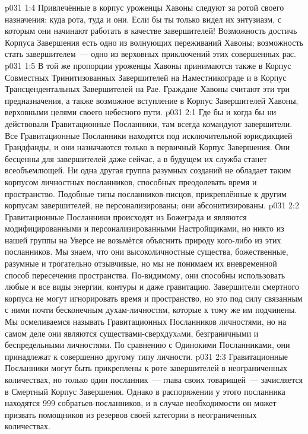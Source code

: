 \vs p031 1:4 Привлечённые в корпус уроженцы Хавоны следуют за ротой своего назначения: куда рота, туда и они. Если бы ты только видел их энтузиазм, с которым они начинают работать в качестве завершителей! Возможность достичь Корпуса Завершения есть одно из волнующих переживаний Хавоны; возможность стать завершителем~--- одно из верховных приключений этих совершенных рас.
\vs p031 1:5 В той же пропорции уроженцы Хавоны принимаются также в Корпус Совместных Тринитизованных Завершителей на Наместникограде и в Корпус Трансцендентальных Завершителей на Рае. Граждане Хавоны считают эти три предназначения, а также возможное вступление в Корпус Завершителей Хавоны, верховными целями своего небесного пути.
\vs p031 2:1 Где бы и когда бы ни действовали Гравитационные Посланники, там всегда командуют завершители. Все Гравитационные Посланники находятся под исключительной юрисдикцией Грандфанды, и они назначаются только в первичный Корпус Завершения. Они бесценны для завершителей даже сейчас, а в будущем их служба станет всеобъемлющей. Ни одна другая группа разумных созданий не обладает таким корпусом личностных посланников, способных преодолевать время и пространство. Подобные типы посланников\hyp{}писцов, прикреплённые к другим корпусам завершителей, не персонализированы; они абсонитизированы.
\vs p031 2:2 \pc Гравитационные Посланники происходят из Божеграда и являются модифицированными и персонализированными Настройщиками, но никто из нашей группы на Уверсе не возьмётся объяснить природу кого\hyp{}либо из этих посланников. Мы знаем, что они высоколичностные существа, божественные, разумные и трогательно отзывчивые, но мы не понимаем их вневременной способ пересечения пространства. По\hyp{}видимому, они способны использовать любые и все виды энергии, контуры и даже гравитацию. Завершители смертного корпуса не могут игнорировать время и пространство, но это под силу связанным с ними почти бесконечным духам\hyp{}личностям, которые к тому же им подчинены. Мы осмеливаемся называть Гравитационных Посланников личностями, но на самом деле они являются существами\hyp{}сверхдухaми, безграничными и беспредельными личностями. По сравнению с Одинокими Посланниками, они принадлежат к совершенно другому типу личности.
\vs p031 2:3 \pc Гравитационные Посланники могут быть прикреплены к роте завершителей в неограниченных количествах, но только один посланник~--- глава своих товарищей~--- зачисляется в Смертный Корпус Завершения. Однако в распоряжении у этого посланника находятся 999 собратьев\hyp{}посланников, и в случае необходимости он может призвать помощников из резервов своей категории в неограниченных количествах.
